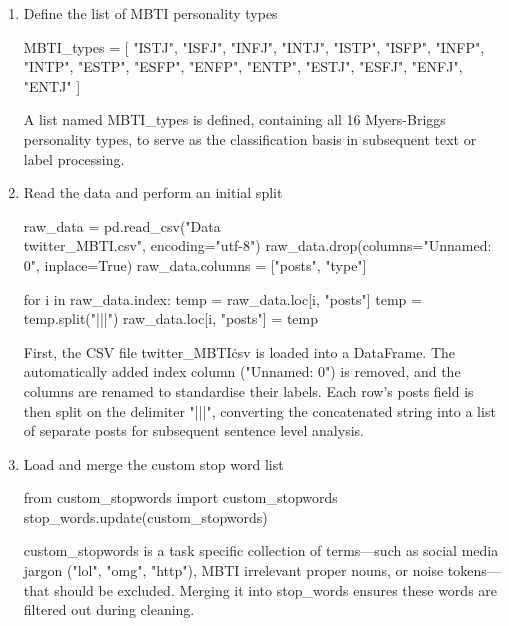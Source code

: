 \documentclass[12pt]{article}
\numberwithin{figure}{section}  %
\begin{document}
\begin{enumerate}
\item Define the list of MBTI personality types
\begin{python}
MBTI_types = [
    "ISTJ", "ISFJ", "INFJ", "INTJ",
    "ISTP", "ISFP", "INFP", "INTP",
    "ESTP", "ESFP", "ENFP", "ENTP",
    "ESTJ", "ESFJ", "ENFJ", "ENTJ"
]

\end{python}
A list named MBTI\_types is defined, containing all 16 Myers-Briggs personality types, to serve as the classification basis in subsequent text or label processing.

\item Read the data and perform an initial split
\begin{python}
raw_data = pd.read_csv("Data\\twitter_MBTI.csv", encoding="utf-8")
raw_data.drop(columns="Unnamed: 0", inplace=True)
raw_data.columns = ["posts", "type"]

for i in raw_data.index:
    temp = raw_data.loc[i, "posts"]
    temp = temp.split("|||")
    raw_data.loc[i, "posts"] = temp

\end{python}
First, the CSV file twitter\_MBTI\.csv is loaded into a DataFrame. The automatically added index column ("Unnamed: 0") is removed, and the columns are renamed to standardise their labels. Each row’s posts field is then split on the delimiter "|||", converting the concatenated string into a list of separate posts for subsequent sentence level analysis.

\item Load and merge the custom stop word list
\begin{python}
from custom_stopwords import custom_stopwords
stop_words.update(custom_stopwords)

\end{python}
custom\_stopwords is a task specific collection of terms—such as social media jargon ("lol", "omg", "http"), MBTI irrelevant proper nouns, or noise tokens—that should be excluded. Merging it into stop\_words ensures these words are filtered out during cleaning.

\end{enumerate}
\end{document}
